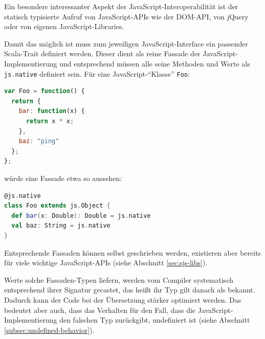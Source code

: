 \documentclass[a4paper, 12pt, hidelinks, listof=totoc, listoftables=totoc, bibliography=totoc]{scrreprt}
\newcommand{\code}[1]{\lstinline[language=Scala, style=inline]|#1|}
\newcommand{\scala}[1]{\lstinline[language=Scala, style=inline]|#1|}
\begin{document}
Ein besonders interessanter Aspekt der JavaScript-Interoperabilität ist der statisch typisierte Aufruf von JavaScript-APIs wie der DOM-API, von jQuery oder von eigenen JavaScript-Libraries.

Damit das möglich ist muss zum jeweiligen JavaScript-Interface ein passender Scala-Trait definiert werden. Dieser dient als reine Fassade der JavaScript-Implementierung und entsprechend müssen alle seine Methoden und Werte als \scala{js.native} definiert sein. Für eine JavaScript-"`Klasse"' \code{Foo}:

\begin{lstlisting}[language=JavaScript, style=snippet]
var Foo = function() {
  return {
    bar: function(x) {
      return x * x;
    },
    baz: "ping"
  };
};
\end{lstlisting}

würde eine Fassade etwa so aussehen:

\begin{lstlisting}[language=Scala, style=snippet]
@js.native
class Foo extends js.Object {
  def bar(x: Double): Double = js.native
  val baz: String = js.native
}
\end{lstlisting}

Entsprechende Fassaden können selbst geschrieben werden, existieren aber bereits für viele wichtige JavaScript-APIs (siehe Abschnitt \ref{sec:sjs-libs}).

%
%

Werte solche Fassaden-Typen liefern, werden vom Compiler systematisch entsprechend ihrer Signatur gecastet, das heißt ihr Typ gilt danach als bekannt. Dadurch kann der Code bei der Übersetzung stärker optimiert werden. Das bedeutet aber auch, dass das Verhalten für den Fall, dass die JavaScript-Implementierung den falschen Typ zurückgibt, undefiniert ist
(siehe Abschnitt \ref{subsec:undefined-behavior}).\cite[Folie 40, Min. 33]{doeraene2015.SSP}
\end{document}
